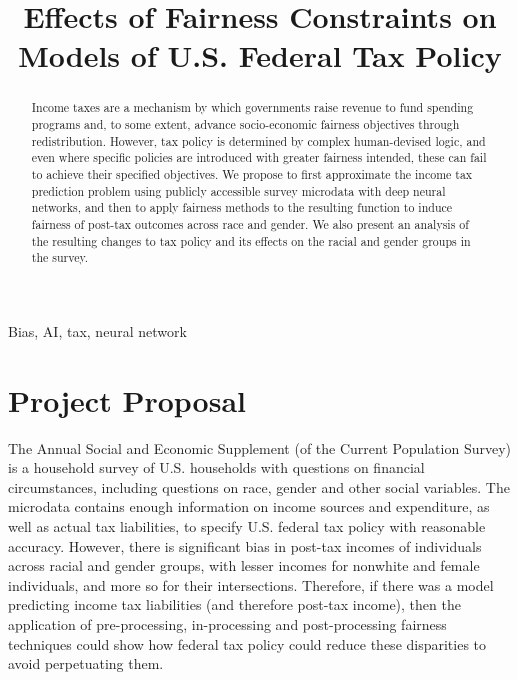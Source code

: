 \documentclass[conference]{IEEEtran}
\begin{document}
\title{Effects of Fairness Constraints on Models of U.S. Federal Tax Policy}

\author{
}

\maketitle

\begin{abstract}
Income taxes are a mechanism by which governments raise revenue to fund spending programs and, to some extent, advance socio-economic fairness objectives through redistribution. However, tax policy is determined by complex human-devised logic, and even where specific policies are introduced with greater fairness intended, these can fail to achieve their specified objectives. We propose to first approximate the income tax prediction problem using publicly accessible survey microdata with deep neural networks, and then to apply fairness methods to the resulting function to induce fairness of post-tax outcomes across race and gender. We also present an analysis of the resulting changes to tax policy and its effects on the racial and gender groups in the survey.
\end{abstract}

\begin{IEEEkeywords}
Bias, AI, tax, neural network
\end{IEEEkeywords}

\section{Project Proposal}
The Annual Social and Economic Supplement (of the Current Population Survey) is a household survey of U.S. households with questions on financial circumstances, including questions on race, gender and other social variables. The microdata contains enough information on income sources and expenditure, as well as actual tax liabilities, to specify U.S. federal tax policy with reasonable accuracy. However, there is significant bias in post-tax incomes of individuals across racial and gender groups, with lesser incomes for nonwhite and female individuals, and more so for their intersections. Therefore, if there was a model predicting income tax liabilities (and therefore post-tax income), then the application of pre-processing, in-processing and post-processing fairness techniques could show how federal tax policy could reduce these disparities to avoid perpetuating them. 
\end{document}
